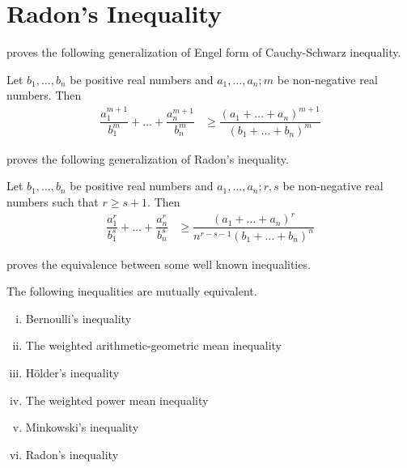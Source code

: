\documentclass[inequalities.tex]{subfile}
\begin{document}
	\section{Radon's Inequality}\label{sec:radon}
	 \textcite{johann_radon_1913} proves the following generalization of Engel form of Cauchy-Schwarz inequality.
		\begin{theorem}
			Let $b_{1},\ldots,b_{n}$ be positive real numbers and $a_{1},\ldots,a_{n};m$ be non-negative real numbers. Then
				\begin{align*}
					\dfrac{a_{1}^{m+1}}{b_{1}^{m}}+\ldots+\dfrac{a_{n}^{m+1}}{b_{n}^{m}}
						& \geq \dfrac{(a_{1}+\ldots+a_{n})^{m+1}}{(b_{1}+\ldots+b_{n})^{m}}
				\end{align*}
		\end{theorem}
	\textcite{yang_2002} proves the following generalization of Radon's inequality.
		\begin{theorem}
			Let $b_{1},\ldots,b_{n}$ be positive real numbers and $a_{1},\ldots,a_{n};r,s$ be non-negative real numbers such that $r\geq s+1$. Then
				\begin{align*}
					\dfrac{a_{1}^{r}}{b_{1}^{s}}+\ldots+\dfrac{a_{n}^{r}}{b_{n}^{s}}
						& \geq \dfrac{(a_{1}+\ldots+a_{n})^{r}}{n^{r-s-1}(b_{1}+\ldots+b_{n})^{n}}
				\end{align*}
		\end{theorem}
	\textcite{yongtao_xian_xiao_2018} proves the equivalence between some well known inequalities.
		\begin{theorem}
			The following inequalities are mutually equivalent.
				\begin{enumerate}[i.]
					\item Bernoulli's inequality
					\item The weighted arithmetic-geometric mean inequality
					\item H\"{o}lder's inequality
					\item The weighted power mean inequality
					\item Minkowski's inequality
					\item Radon's inequality
				\end{enumerate}
		\end{theorem}
\end{document}
